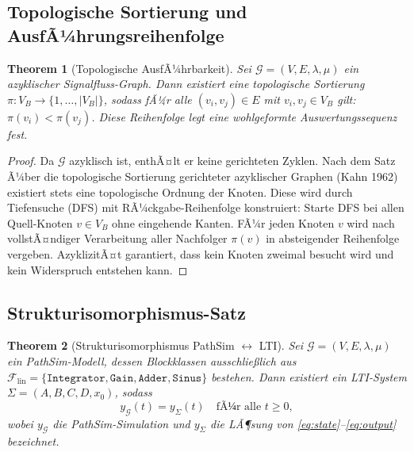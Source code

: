 ﻿\documentclass[12pt,a4paper]{article}
\newtheorem{theorem}{Theorem}[section]
\theoremstyle{definition}
\begin{document}
\subsection{Topologische Sortierung und AusfÃ¼hrungsreihenfolge}

\begin{theorem}[Topologische AusfÃ¼hrbarkeit]
\label{thm:topo}
Sei $\mathcal{G} = (V, E, \lambda, \mu)$ ein azyklischer Signal\-fluss-Graph.
Dann existiert eine topologische Sortierung $\pi : V_B \to \{1, \ldots, |V_B|\}$,
sodass fÃ¼r alle $(v_i, v_j) \in E$ mit $v_i, v_j \in V_B$ gilt:
$\pi(v_i) < \pi(v_j)$. Diese Reihenfolge legt eine wohlgeformte Auswertungssequenz
fest.
\end{theorem}

\begin{proof}
Da $\mathcal{G}$ azyklisch ist, enthÃ¤lt er keine gerichteten Zyklen. Nach dem
Satz Ã¼ber die topologische Sortierung gerichteter azyklischer Graphen (Kahn 1962)
existiert stets eine topologische Ordnung der Knoten. Diese wird durch Tiefensuche
(DFS) mit RÃ¼ckgabe-Reihenfolge konstruiert: Starte DFS bei allen Quell-Knoten
$v \in V_B$ ohne eingehende Kanten. FÃ¼r jeden Knoten $v$ wird nach vollstÃ¤ndiger
Verarbeitung aller Nachfolger $\pi(v)$ in absteigender Reihenfolge vergeben.
AzyklizitÃ¤t garantiert, dass kein Knoten zweimal besucht wird und kein
Widerspruch entstehen kann.
\end{proof}

\subsection{Strukturisomorphismus-Satz}

\begin{theorem}[Strukturisomorphismus PathSim $\leftrightarrow$ LTI]
\label{thm:iso}
Sei $\mathcal{G} = (V, E, \lambda, \mu)$ ein PathSim-Modell, dessen Blockklassen
ausschlie\ss{}lich aus $\mathcal{F}_{\mathrm{lin}} = \{\texttt{Integrator},
\texttt{Gain}, \texttt{Adder}, \texttt{Sinus}\}$ bestehen. Dann
existiert ein LTI-System $\Sigma = (A, B, C, D, x_0)$, sodass
\[
  y_{\mathcal{G}}(t) = y_{\Sigma}(t) \quad \text{fÃ¼r alle } t \geq 0,
\]
wobei $y_{\mathcal{G}}$ die PathSim-Simulation und $y_{\Sigma}$ die LÃ¶sung
von \eqref{eq:state}--\eqref{eq:output} bezeichnet.
\end{theorem}
\end{document}
